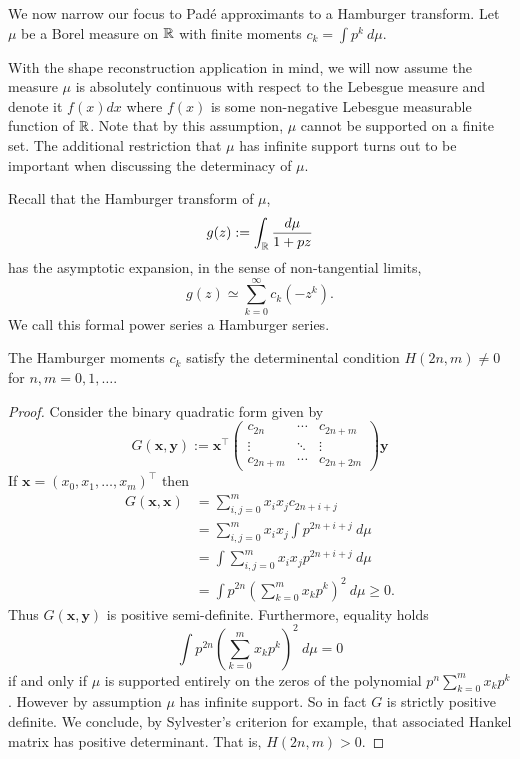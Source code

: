 We now narrow our focus to Pad\'e approximants to a Hamburger transform. Let $\mu$ be a Borel measure on $\mathbb{R}$ with finite moments $c_k = \int p^k ~d\mu$. 

With the shape reconstruction application in mind, we will now assume the measure $\mu$ is absolutely continuous with respect to the Lebesgue measure and denote it $f(x)dx$ where $f(x)$ is some non-negative Lebesgue measurable function of $\mathbb{R}$. Note that by this assumption, $\mu$ cannot be supported on a finite set. The additional restriction that $\mu$ has infinite support turns out to be important when discussing the determinacy of $\mu$.

Recall that the Hamburger transform of $\mu$,
\[
    g(z) := \int_{\mathbb{R}} \frac{d\mu}{1+pz}
\]
has the asymptotic expansion, in the sense of non-tangential limits,
\[
  g(z) \simeq \sum_{k=0}^\infty c_k (-z^k).
\]
We call this formal power series a Hamburger series. 


\begin{lemma}
  The Hamburger moments $c_k$ satisfy the determinental condition $H(2n, m) \neq 0$ for $n,m = 0, 1, \ldots$. 
\end{lemma}

\begin{proof}
  Consider the binary quadratic form given by
  \[
    G(\mathbf{x}, \mathbf{y}) :=
    \mathbf{x}^\top
    \begin{pmatrix}
      c_{2n} & \cdots & c_{2n+m} \\
      \vdots & \ddots & \vdots  \\
      c_{2n+m} & \cdots & c_{2n+2m}
    \end{pmatrix}
    \mathbf{y}
  \]
  If $\mathbf{x} = {(x_0, x_1, \ldots, x_m)}^\top$ then
  \begin{align*}
    G(\mathbf{x}, \mathbf{x})
    &= \sum_{i,j=0}^m x_i x_j c_{2n+i+j} \\
    &= \sum_{i,j=0}^m x_i x_j \int p^{2n+i+j} ~d\mu \\
    &= \int \sum_{i,j=0}^m x_i x_j p^{2n+i+j} ~d\mu \\
    &= \int p^{2n} {\left(\sum_{k=0}^m x_k p^{k}\right)}^2 ~d\mu 
    \geq 0.
  \end{align*}
  Thus $G(\mathbf{x}, \mathbf{y})$ is positive semi-definite. Furthermore, equality holds
  \[
    \int p^{2n}{\left(\sum_{k=0}^m x_k p^{k}\right)}^2 ~d\mu = 0
  \]
  if and only if $\mu$ is supported entirely on the zeros of the polynomial $p^n\sum_{k=0}^m x_k p^{k}$. However by assumption $\mu$ has infinite support. So in fact $G$ is strictly positive definite. We conclude, by Sylvester's criterion for example, that associated Hankel matrix has positive determinant. That is, $H(2n, m) > 0$.
\end{proof}

